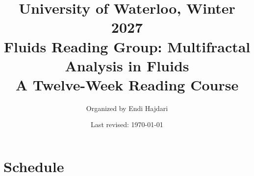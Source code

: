 \documentclass{article}
\title{
    {\large University of Waterloo, Winter 2027}\\[0.4em]
    {\huge\bfseries Fluids Reading Group: Multifractal Analysis in Fluids}\\[0.4em]
    {\Large A Twelve-Week Reading Course}
}
\author{
    {\large Organized by Endi Hajdari}\\[1.2em]}
\date{
    \vspace{0.5cm}
    {\small Last revised: \today}
}
\begin{document}
\maketitle

\section{Schedule}
\end{document}
